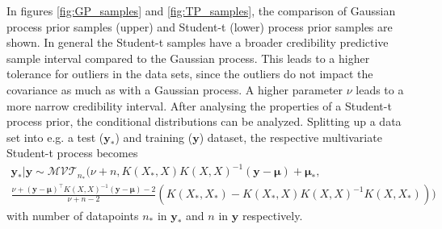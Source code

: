 In figures \ref{fig:GP_samples} and \ref{fig:TP_samples}, the comparison of Gaussian process prior samples (upper) and Student-t (lower) process prior samples are shown. In general the Student-t samples have a broader credibility predictive sample interval compared to the Gaussian process. This leads to a higher tolerance for outliers in the data sets, since the outliers do not impact the covariance as much as with a Gaussian process. A higher parameter $\nu$ leads to a more narrow credibility interval.
After analysing the properties of a Student-t process prior, the conditional distributions can be analyzed. Splitting up a data set into e.g. a test ($\bm{y}_*$) and training ($\bm{y}$) dataset, the respective multivariate Student-t process becomes
\begin{subequations}%
	\label{eq:multivariate student t conditional distribution}
	\begin{align}
	\scriptstyle
	\bm{y}_*|\bm{y} \sim \mathcal{MVT}_{n_*}(\nu+n, K(X_*,X)K(X,X)^{-1}(\bm{y}-\bm{\mu})+\bm{\mu_*},  \nonumber \\
	\scriptstyle
	 \frac{\nu+(\bm{y}-\bm{\mu})^{\top}K(X,X)^{-1}(\bm{y}-\bm{\mu})-2 }{\nu+n-2}(K(X_*,X_*)-K(X_*,X)K(X,X)^{-1}K(X,X_*))) 
	\end{align}
\end{subequations}
with number of datapoints $n_*$ in $\bm{y}_*$ and $n$ in $\bm{y}$ respectively. 